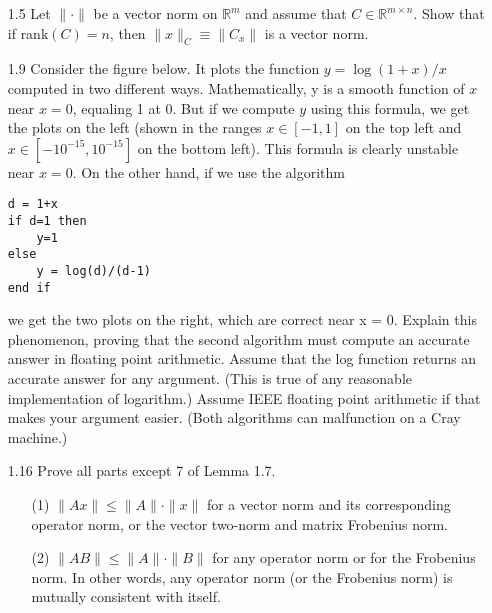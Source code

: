 \documentclass[12pt,letterpaper,reqno]{amsart}
\newcommand{\R}{\mathbb R}
\begin{document}
\begin{enumerate}
\begin{flushleft}
\end{flushleft}
\item[1.5] Let $\| \cdot \|$ be a vector norm on $\R^m$ and assume that $C \in \R^{m\times n}$. Show that if rank$(C) = n$, then $\| x \|_C \equiv \| C_x \|$ is a vector norm.
\begin{flushleft}

\end{flushleft}
\item[1.9] Consider the figure below. It plots the function $y = \log(1+x)/x$ computed in two different ways. Mathematically, y is a
smooth function of $x$ near $x = 0$, equaling 1 at 0. But if we compute $y$ using this formula, we get the plots on the left (shown in the ranges $x \in [-1, 1]$ on the top left and $x \in [-10^{-15} , 10^{-15}]$ on the bottom left). This formula is clearly unstable near $x = 0$. On the other hand, if we use the algorithm

\begin{lstlisting}
d = 1+x
if d=1 then
    y=1
else
    y = log(d)/(d-1)
end if
\end{lstlisting}

we get the two plots on the right, which are correct near x = 0. Explain this phenomenon, proving that the second algorithm must compute an accurate answer in floating point arithmetic. Assume that the log function returns an accurate answer for any argument. (This is true of any reasonable implementation of logarithm.) Assume IEEE floating point arithmetic if that makes your argument easier. (Both algorithms can malfunction on a Cray machine.)
\begin{flushleft}

\end{flushleft}
\item[1.16] Prove all parts except 7 of Lemma 1.7.
\begin{enumerate}
    \item[(1)] $ \| A x\| \leq \| A\| \cdot \| x\| $ for a vector norm and its corresponding operator norm, or the vector two-norm and matrix Frobenius norm.
    \begin{flushleft}

    \end{flushleft}
    \item[(2)] $ \|A B\| \leq\|A\| \cdot\|B\| $ for any operator norm or for the Frobenius norm. In other words, any operator norm (or the Frobenius norm) is mutually consistent with itself.
    \begin{flushleft}


\end{flushleft}
\end{enumerate}
\end{enumerate}
\end{document}
